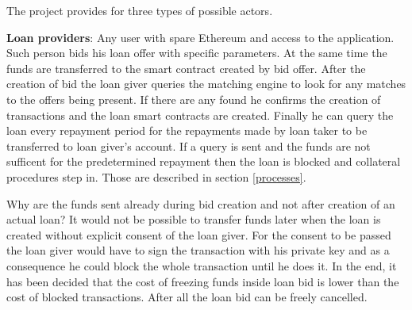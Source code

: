 \documentclass[a4paper,12pt,twoside,openany]{report}
\begin{document}
The project provides for three types of possible actors. 

\textbf{Loan providers}: Any user with spare Ethereum and access to the application. Such person bids his loan offer with specific parameters. At the same time the funds are transferred to the smart contract created by bid offer. After the creation of bid the loan giver queries the matching engine to look for any matches to the offers being present. If there are any found he confirms the creation of transactions and the loan smart contracts are created. Finally he can query the loan every repayment period for the repayments made by loan taker to be transferred to loan giver's account. If a query is sent and the funds are not sufficent for the predetermined repayment then the loan is blocked and collateral procedures step in. Those are described in section \ref{processes}.

Why are the funds sent already during bid creation and not after creation of an actual loan? It would not be possible to transfer funds later when the loan is created without explicit consent of the loan giver. For the consent to be passed the loan giver would have to sign the transaction with his private key and as a consequence he could block the whole transaction until he does it. In the end, it has been decided that the cost of freezing funds inside loan bid is lower than the cost of blocked transactions. After all the loan bid can be freely cancelled.
\end{document}
